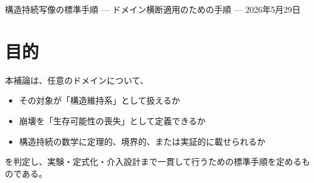 \documentclass[12pt,a4paper]{article}
\begin{document}
\PaperTitleBlock
  {構造持続写像の標準手順}
  {— ドメイン横断適用のための手順 —}
  {2026年5月29日}

\begin{abstract}
本補論は、構造持続の最小形式

\[
S = Me^{-L}
\]

を個別ドメインへ写像するための標準手順を与える。目的は、任意の対象について、それが構造維持系として扱えるか、崩壊を生存可能性の喪失として定義できるか、そしてそのドメインについて、定理、境界、または実証のいずれの強さで構造持続の数学に載せられるかを、同じ手順で判定できるようにすることである。

本手順は、対象構造、維持条件、有効選択肢空間、制約集合、累積段階損失 L、余力 μ、初期有効選択肢多様性 N\_eff\^{}(0) を順に定義し、仕様固定構造層、条件付き構造埋め込み層、構造推定層のいずれかへ位置づける。さらに、反証条件の事前固定、基準モデルとの比較、予測頑健性テスト、介入設計までを一つの流れとして与える。これにより、ドメインごとに異なる語で語られてきた崩壊や劣化を、共通の骨格のもとで比較・検証するための標準手順を与える。

本補論で最も重要な運用規律は、「探索的に写像を作ってはならない」という禁止ではなく、「写像発見と検証を混同しない」という分離である。現実ドメインでは、維持対象、測度、段階損失指標、修復指標を探索的に発見する段階がありうる。この段階の産物は candidate signal または candidate mapping であり、support ではない。support と呼べるのは、写像、指標、split、metric、baseline を凍結した後に、holdout / future / fresh archive / outside rerun で予測力の増分を示した場合に限る。探索で外れた候補、凍結後に外れた写像、baseline と重複していた追加軸も、失敗として捨てず、次の写像発見に使える台帳として記録する。
\end{abstract}

\section{目的}\label{ux76eeux7684}

本補論は、任意のドメインについて、

\begin{itemize}
\tightlist
\item
  その対象が「構造維持系」として扱えるか
\item
  崩壊を「生存可能性の喪失」として定義できるか
\item
  構造持続の数学に定理的、境界的、または実証的に載せられるか
\end{itemize}

を判定し、実験・定式化・介入設計まで一貫して行うための標準手順を定めるものである。
\end{document}
